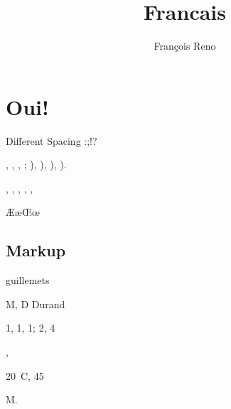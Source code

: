\documentclass{report}
\begin{document}
\title{Francais}
\author{Fran\c{c}ois Reno}
\maketitle
\chapter{Oui!}

Different Spacing :;!?

\No \no


\primo, \secundo, \tertio, \quarto; \fprimo), \fsecundo), \ftertio), \fquarto).

\ieme, \iemes, \ier, \iers, \iere, \ieres


\textminus\textplusminus{}

\AE \ae \OE \oe \at \circonflexe \tild \boi \degre

\section{Markup}
\og guillemets \fg{}

M, D Durand

1\ier{}, 1\iere{}, 1\ieres{}; 2\ieme{}, 4\iemes{}

, 

20~\degres C, 45\degres

M. 

\end{document}
